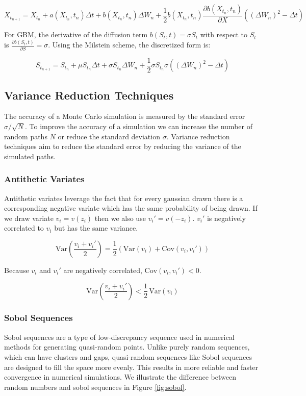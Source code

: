 \documentclass{article}
\begin{document}
\[
X_{t_{n+1}} = X_{t_n} + a(X_{t_n}, t_n) \Delta t + b(X_{t_n}, t_n) \Delta W_n + \frac{1}{2} b(X_{t_n}, t_n) \frac{\partial b(X_{t_n}, t_n)}{\partial X} \left( (\Delta W_n)^2 - \Delta t \right)
\]

For GBM, the derivative of the diffusion term $b(S_t, t) = \sigma S_t$ with respect to $S_t$ is $\frac{\partial b(S_t, t)}{\partial S} = \sigma$. Using the Milstein scheme, the discretized form is:

\[
S_{t_{n+1}} = S_{t_n} + \mu S_{t_n} \Delta t + \sigma S_{t_n} \Delta W_n + \frac{1}{2} \sigma S_{t_n} \sigma \left( (\Delta W_n)^2 - \Delta t \right)
\]

\newpage
\subsection{Variance Reduction Techniques}

The accuracy of a Monte Carlo simulation is measured by the standard error $\sigma / \sqrt{N}$. To improve the accuracy of a simulation we can increase the number 
of random paths $N$ or reduce the standard deviation $\sigma$. Variance reduction techniques aim to reduce the standard error by reducing the variance of the simulated paths.

\subsubsection{Antithetic Variates}

Antithetic variates leverage the fact that for every gaussian drawn there is a corresponding negative variate which 
has the same probability of being drawn. If we draw variate $v_i = v(z_i)$ then we also use $v_i' = v(-z_i)$. $v_i'$ 
is negatively correlated to $v_i$ but has the same variance.\cite{jackel}

\[
\text{Var}\left( \frac{v_i + v_i'}{2} \right) = \frac{1}{2} \left( \text{Var}(v_i) + \text{Cov}(v_i, v_i') \right)
\]

Because $v_i$ and $v_i'$ are negatively correlated, $\text{Cov}(v_i, v_i') < 0$.

\[
\text{Var}\left( \frac{v_i + v_i'}{2} \right) < \frac{1}{2} \, \text{Var}(v_i)
\]

\subsubsection{Sobol Sequences}

Sobol sequences are a type of low-discrepancy sequence used in numerical methods for generating quasi-random points. 
Unlike purely random sequences, which can have clusters and gaps, quasi-random sequences like Sobol sequences are designed 
to fill the space more evenly. This results in more reliable and faster convergence in numerical simulations. We illustrate 
the difference between random numbers and sobol sequences in Figure \ref{fig:sobol}.
\end{document}
